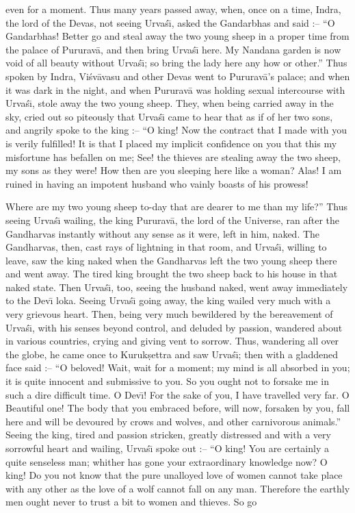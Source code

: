 even for a moment. Thus many years passed away, when, once on a time, Indra, the lord of the Devas, not seeing Urva\'s\={\i}, asked the Gandarbhas and said :-- ``O Gandarbhas! Better go and steal away the two young sheep in a proper time from the palace of Pururav\=a, and then bring Urva\'s\={\i} here. My Nandana garden is now void of all beauty without Urva\'s\={\i}; so bring the lady here any how or other.'' Thus spoken by Indra, Vi\'sv\=avasu and other Devas went to Pururav\=a's palace; and when it was dark in the night, and when Pururav\=a was holding sexual intercourse with Urva\'s\={\i}, stole away the two young sheep. They, when being carried away in the sky, cried out so piteously that Urva\'s\={\i} came to hear that as if of her two sons, and angrily spoke to the king :-- ``O king! Now the contract that I made with you is verily fulfilled! It is that I placed my implicit confidence on you that this my misfortune has befallen on me; See! the thieves are stealing away the two sheep, my sons as they were! How then are you sleeping here like a woman? Alas! I am ruined in having an impotent husband who vainly boasts of his prowess!

Where are my two young sheep to-day that are dearer to me than my life?'' Thus seeing Urva\'s\={\i} wailing, the king Pururav\=a, the lord of the Universe, ran after the Gandharvas instantly without any sense as it were, left in him, naked. The Gandharvas, then, cast rays of lightning in that room, and Urva\'s\={\i}, willing to leave, saw the king naked when the Gandharvas left the two young sheep there and went away. The tired king brought the two sheep back to his house in that naked state. Then Urva\'s\={\i}, too, seeing the husband naked, went away immediately to the Dev\={\i} loka. Seeing Urva\'s\={\i} going away, the king wailed very much with a very grievous heart. Then, being very much bewildered by the bereavement of Urva\'s\={\i}, with his senses beyond control, and deluded by passion, wandered about in various countries, crying and giving vent to sorrow. Thus, wandering all over the globe, he came once to Kuruk\d{s}ettra and saw Urva\'s\={\i}; then with a gladdened face said :-- ``O beloved! Wait, wait for a moment; my mind is all absorbed in you; it is quite innocent and submissive to you. So you ought not to forsake me in such a dire difficult time. O Dev\={\i}! For the sake of you, I have travelled very far. O Beautiful one! The body that you embraced before, will now, forsaken by you, fall here and will be devoured by crows and wolves, and other carnivorous animals.'' Seeing the king, tired and passion stricken, greatly distressed and with a very sorrowful heart and wailing, Urva\'s\={\i} spoke out :-- ``O king! You are certainly a quite senseless man; whither has gone your extraordinary knowledge now? O king! Do you not know that the pure unalloyed love of women cannot take place with any other as the love of a wolf cannot fall on any man. Therefore the earthly men ought never to trust a bit to women and thieves. So go

